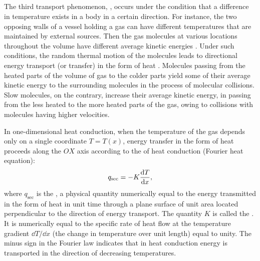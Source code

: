 \subsection{}\label{10.8.5} The third transport phenomenon, , occurs under the condition that a difference in temperature exists in a body in a certain direction. For instance, the two opposing walls of a vessel holding a gas can have different temperatures that are maintained by external sources. Then the gas molecules at various locations throughout the volume have different average kinetic energies . Under such conditions, the random thermal motion of the molecules leads to directional energy transport (or transfer) in the form of heat . Molecules passing from the heated parts of the volume of gas to the colder parts yield some of their average kinetic energy to the surrounding molecules in the process of molecular collisions. Slow molecules, on the contrary, increase their average kinetic energy, in passing from the less heated to the more heated parts of the gas, owing to collisions with molecules having higher velocities.

In one-dimensional heat conduction, when the temperature of the gas depends only on a single coordinate $T = T (x)$, energy transfer in the form of heat proceeds along the $OX$ axis according to the  of heat conduction (Fourier heat equation): 
\begin{equation*}%
q_{\textrm{sec}} = - K \dv{T}{x},
\end{equation*}
where $q_{\textrm{sec}}$ is the , a physical quantity numerically equal to the energy transmitted in the form of heat in unit time through a plane surface of unit area located perpendicular to the direction of energy transport. The quantity $K$ is called the . It is numerically equal to the specific rate of heat flow at the temperature gradient $\dd T / \dd x$ (the change in temperature over unit length) equal to unity. The minus sign in the Fourier law indicates that in heat conduction energy is transported in the direction of decreasing temperatures.


